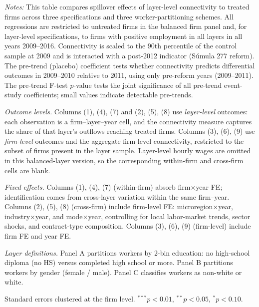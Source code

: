 \begin{table}[H]
\begin{minipage}{\linewidth}
\textit{Notes:} This table compares spillover effects of layer-level connectivity to treated firms across three specifications and three worker-partitioning schemes. All regressions are restricted to untreated firms in the balanced firm panel and, for layer-level specifications, to firms with positive employment in all layers in all years 2009--2016. Connectivity is scaled to the 90th percentile of the control sample at 2009 and is interacted with a post-2012 indicator (S\'{u}mula 277 reform). The pre-trend (placebo) coefficient tests whether connectivity predicts differential outcomes in 2009--2010 relative to 2011, using only pre-reform years (2009--2011). The pre-trend F-test $p$-value tests the joint significance of all pre-trend event-study coefficients; small values indicate detectable pre-trends.

\textit{Outcome levels.} Columns (1), (4), (7) and (2), (5), (8) use \textit{layer-level} outcomes: each observation is a firm--layer--year cell, and the connectivity measure captures the share of that layer's outflows reaching treated firms. Columns (3), (6), (9) use \textit{firm-level} outcomes and the aggregate firm-level connectivity, restricted to the subset of firms present in the layer sample. Layer-level hourly wages are omitted in this balanced-layer version, so the corresponding within-firm and cross-firm cells are blank.

\textit{Fixed effects.} Columns (1), (4), (7) (within-firm) absorb firm$\times$year FE; identification comes from cross-layer variation within the same firm--year. Columns (2), (5), (8) (cross-firm) include firm-level FE: microregion$\times$year, industry$\times$year, and mode$\times$year, controlling for local labor-market trends, sector shocks, and contract-type composition. Columns (3), (6), (9) (firm-level) include firm FE and year FE.

\textit{Layer definitions.} Panel A partitions workers by 2-bin education: no high-school diploma (no HS) versus completed high school or more. Panel B partitions workers by gender (female / male). Panel C classifies workers as non-white or white.

Standard errors clustered at the firm level. $^{***}p<0.01$, $^{**}p<0.05$, $^{*}p<0.10$.
\end{minipage}
\end{table}